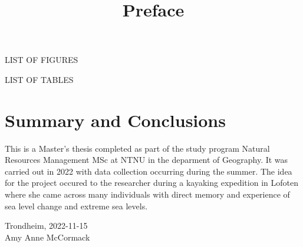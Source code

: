 LIST OF FIGURES

LIST OF TABLES


\section*{Summary and Conclusions}

\title{Preface}
This is a Master's thesis completed as part of the study program Natural Resources Management MSc at NTNU in the deparment of Geography. It was carried out in 2022 with data collection occurring during the summer. The idea for the project occured to the researcher during a kayaking expedition in Lofoten where she came across many individuals with direct memory and experience of sea level change and extreme sea levels. \\[2cm]

\begin{center}
Trondheim, 2022-11-15\\[1pc]


Amy Anne McCormack 
\end{center}

\documentclass{article}
\usepackage{graphicx}
\graphicspath{ {./images/} }
\texttt{[image: fig/to use signature png]}

